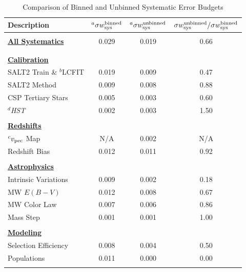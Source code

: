 \begin{table}
\centering
\caption{Comparison of Binned and Unbinned Systematic Error Budgets}
\begin{tabular}{lccc}
\toprule

Description  & $^a\sigma w^{\rm binned}_{\rm sys}$&$^a\sigma w^{\rm unbinned}_{\rm sys}$ &  $\sigma w^{\rm unbinned}_{\rm sys}/\sigma w^{\rm binned}_{\rm sys}$\\
\hline \\

\textbf{\ul{All Systematics}} & 0.029 & 0.019 & 0.66\\
\\
\hline \\

\textbf{\ul{Calibration}}\\ %

SALT2 Train \& $^b$LCFIT  & 0.019 & 0.009 & 0.47\\
SALT2 Method & 0.009 & 0.008 &  0.88\\
CSP Tertiary Stars  & 0.005 & 0.003 & 0.60\\
$^d${\it HST} & 0.002 & 0.003 & 1.50 \\
\\

\textbf{\ul{Redshifts}}\\
$^cv_{\rm pec}$ Map & N/A & 0.002 & N/A\\
Redshift Bias & 0.012 & 0.011 & 0.92\\
\\

\textbf{\ul{Astrophysics}}\\

Intrinsic Variations & 0.009 & 0.002 & 0.18 \\
MW $E(B-V)$ & 0.012 & 0.008 & 0.67\\
MW Color Law & 0.007 & 0.006 & 0.86\\
Mass Step & 0.001 & 0.001 & 1.00\\
\\

\textbf{\ul{Modeling}}\\

Selection Efficiency & 0.008 & 0.004 & 0.50\\
Populations & 0.011 & 0.000 & 0.00 \\

\\


\end{tabular}
\end{table}
